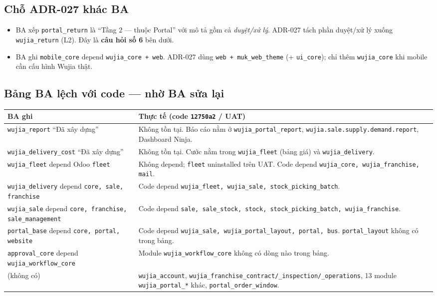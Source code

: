 \subsection*{Chỗ ADR-027 khác BA}

\begin{itemize}
\item BA xếp \texttt{portal\_return} là ``Tầng 2 --- thuộc Portal'' với mô tả gồm cả \emph{duyệt/xử
  lý}. ADR-027 tách phần duyệt/xử lý xuống \texttt{wujia\_return} (L2). Đây là \textbf{câu hỏi số 6}
  bên dưới.
\item BA ghi \texttt{mobile\_core} depend \texttt{wujia\_core + web}. ADR-027 dùng \texttt{web +
  muk\_web\_theme} (+ \texttt{ui\_core}); chỉ thêm \texttt{wujia\_core} khi mobile cần cấu hình
  Wujia thật.
\end{itemize}

\subsection*{Bảng BA lệch với code --- nhờ BA sửa lại}

\begin{center}
\footnotesize
\begin{tabularx}{\textwidth}{>{\raggedright\arraybackslash}p{4.6cm}>{\raggedright\arraybackslash}X}
\toprule
\textbf{BA ghi} & \textbf{Thực tế (code \texttt{12750a2} / UAT)} \\
\midrule
\texttt{wujia\_report} ``Đã xây dựng'' & Không tồn tại. Báo cáo nằm ở \texttt{wujia\_portal\_report}, \texttt{wujia.sale.supply.demand.report}, Dashboard Ninja. \\
\texttt{wujia\_delivery\_cost} ``Đã xây dựng'' & Không tồn tại. Cước nằm trong \texttt{wujia\_fleet} (bảng giá) và \texttt{wujia\_delivery}. \\
\texttt{wujia\_fleet} depend Odoo \texttt{fleet} & Không depend; \texttt{fleet} uninstalled trên UAT. Code depend \texttt{wujia\_core, wujia\_franchise, mail}. \\
\texttt{wujia\_delivery} depend \texttt{core, sale, franchise} & Code depend \texttt{wujia\_fleet, wujia\_sale, stock\_picking\_batch}. \\
\texttt{wujia\_sale} depend \texttt{core, franchise, sale\_management} & Code depend \texttt{sale, sale\_stock, stock, stock\_picking\_batch, wujia\_franchise}. \\
\texttt{portal\_base} depend \texttt{core, portal, website} & Code depend \texttt{wujia\_sale, wujia\_portal\_layout, portal, bus}. \texttt{portal\_layout} không có trong bảng. \\
\texttt{approval\_core} depend \texttt{wujia\_workflow\_core} & Module \texttt{wujia\_workflow\_core} không có dòng nào trong bảng. \\
(không có) & \texttt{wujia\_account}, \texttt{wujia\_franchise\_contract/\_inspection/\_operations}, 13 module \texttt{wujia\_portal\_*} khác, \texttt{portal\_order\_window}. \\
\bottomrule
\end{tabularx}
\end{center}

